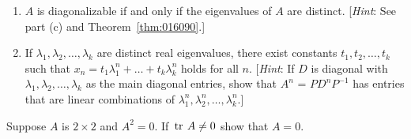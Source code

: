 \begin{multicols}{2}
\begin{ex}
\begin{enumerate}[label={\alph*.}]
\item $A$ is diagonalizable if and only if the eigenvalues of $A$ are distinct. [\textit{Hint}: See part (c) and Theorem~\ref{thm:016090}.]

\item If $\lambda_{1}, \lambda_{2}, \dots, \lambda_{k}$ are distinct real eigenvalues, there exist constants $t_{1}, t_{2}, \dots, t_{k}$ such that $x_n = t_1\lambda_1^n + \dots + t_k\lambda_k^n$ holds for all $n$. [\textit{Hint}: If $D$ is diagonal with $\lambda_{1}, \lambda_{2}, \dots, \lambda_{k}$ as the main diagonal entries, show that $A^{n}$ = $PD^{n}P^{-1}$ has entries that are linear combinations of $\lambda_1^n, \lambda_2^n, \dots, \lambda_k^n$.]
\end{enumerate}
\end{ex}

\begin{ex} Suppose $A$ is $2 \times 2$ and $A^2=0$. If $\thinspace\operatorname{tr\medspace} A \neq 0$ show that $A=0$.
\end{ex}
\end{multicols}
